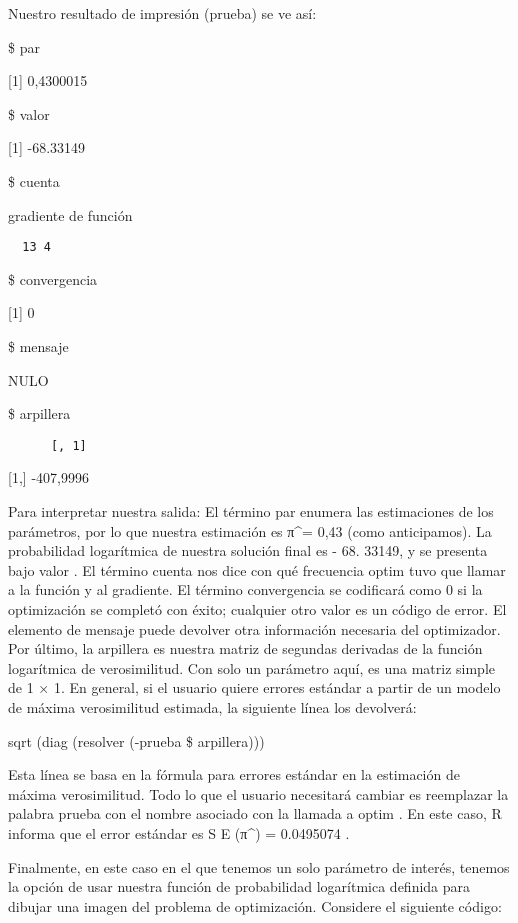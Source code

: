 \documentclass[
]{book}
\begin{document}
Nuestro resultado de impresión (prueba) se ve así:

\$ par

{[}1{]} 0,4300015

\$ valor

{[}1{]} -68.33149

\$ cuenta

gradiente de función

\begin{verbatim}
  13 4
\end{verbatim}

\$ convergencia

{[}1{]} 0

\$ mensaje

NULO

\$ arpillera

\begin{verbatim}
      [, 1]
\end{verbatim}

{[}1,{]} -407,9996

Para interpretar nuestra salida: El término par enumera las estimaciones de los parámetros, por lo que nuestra estimación es π\^{}= 0,43 (como anticipamos). La probabilidad logarítmica de nuestra solución final es - 68. 33149, y se presenta bajo valor . El término cuenta nos dice con qué frecuencia optim tuvo que llamar a la función y al gradiente. El término convergencia se codificará como 0 si la optimización se completó con éxito; cualquier otro valor es un código de error. El elemento de mensaje puede devolver otra información necesaria del optimizador. Por último, la arpillera es nuestra matriz de segundas derivadas de la función logarítmica de verosimilitud. Con solo un parámetro aquí, es una matriz simple de 1 × 1. En general, si el usuario quiere errores estándar a partir de un modelo de máxima verosimilitud estimada, la siguiente línea los devolverá:

sqrt (diag (resolver (-prueba \$ arpillera)))

Esta línea se basa en la fórmula para errores estándar en la estimación de máxima verosimilitud. Todo lo que el usuario necesitará cambiar es reemplazar la palabra prueba con el nombre asociado con la llamada a optim . En este caso, R informa que el error estándar es S E (π\^{}) = 0.0495074 .

Finalmente, en este caso en el que tenemos un solo parámetro de interés, tenemos la opción de usar nuestra función de probabilidad logarítmica definida para dibujar una imagen del problema de optimización. Considere el siguiente código:
\end{document}
